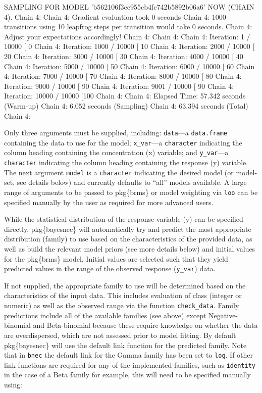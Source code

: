 \documentclass[
]{jss}
\begin{document}
\begin{CodeChunk}
\begin{CodeOutput}
SAMPLING FOR MODEL 'b562106f3cc955cb4fc742b5892b06a6' NOW (CHAIN 4).
Chain 4: 
Chain 4: Gradient evaluation took 0 seconds
Chain 4: 1000 transitions using 10 leapfrog steps per transition would take 0 seconds.
Chain 4: Adjust your expectations accordingly!
Chain 4: 
Chain 4: 
Chain 4: Iteration:    1 / 10000 [  0%
Chain 4: Iteration: 1000 / 10000 [ 10%
Chain 4: Iteration: 2000 / 10000 [ 20%
Chain 4: Iteration: 3000 / 10000 [ 30%
Chain 4: Iteration: 4000 / 10000 [ 40%
Chain 4: Iteration: 5000 / 10000 [ 50%
Chain 4: Iteration: 6000 / 10000 [ 60%
Chain 4: Iteration: 7000 / 10000 [ 70%
Chain 4: Iteration: 8000 / 10000 [ 80%
Chain 4: Iteration: 9000 / 10000 [ 90%
Chain 4: Iteration: 9001 / 10000 [ 90%
Chain 4: Iteration: 10000 / 10000 [100%
Chain 4: 
Chain 4:  Elapsed Time: 57.342 seconds (Warm-up)
Chain 4:                6.052 seconds (Sampling)
Chain 4:                63.394 seconds (Total)
Chain 4: 
\end{CodeOutput}
\end{CodeChunk}

Only three arguments must be supplied, including: \texttt{data}---a
\texttt{data.frame} containing the data to use for the model;
\texttt{x\_var}---a \texttt{character} indicating the column heading
containing the concentration (x) variable; and \texttt{y\_var}---a
\texttt{character} indicating the column heading containing the response
(y) variable. The next argument \texttt{model} is a \texttt{character}
indicating the desired model (or model-set, see details below) and
currently defaults to ``all'' models available. A large range of
arguments to be passed to pkg\{brms\} or model weighting via
\texttt{loo} can be specified manually by the user as required for more
advanced users.

While the statistical distribution of the response variable (y) can be
specified directly, pkg\{bayesnec\} will automatically try and predict
the most appropriate distribution (family) to use based on the
characteristics of the provided data, as well as build the relevant
model priors (see more details below) and initial values for the
pkg\{brms\} model. Initial values are selected such that they yield
predicted values in the range of the observed response (\texttt{y\_var})
data.

If not supplied, the appropriate family to use will be determined based
on the characteristics of the input data. This includes evaluation of
class (integer or numeric) as well as the observed range via the
function \texttt{check\_data}. Family predictions include all of the
available families (see above) except Negative-binomial and
Beta-binomial because these require knowledge on whether the data are
overdispersed, which are not assessed prior to model fitting. By default
pkg\{bayesnec\} will use the default link function for the predicted
family. Note that in \texttt{bnec} the default link for the Gamma family
has been set to \texttt{log}. If other link functions are required for
any of the implemented families, such as \texttt{identity} in the case
of a Beta family for example, this will need to be specified manually
using:
\end{document}
